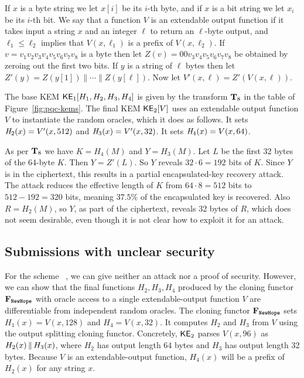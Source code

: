  If $x$ is a byte string we let $x[i]$ be its $i$-th byte, and if $x$ is a bit string we let $x_i$ be its $i$-th bit. We say that a function $V$ is an extendable output function if it takes input a string $x$ and an integer $\ell$ to return an $\ell$-byte output, and $\ell_1 \leq \ell_2$ implies that $V(x,\ell_1)$ is a prefix of $V(x,\ell_2)$. If $v = v_1v_2v_3v_4v_5v_6v_7v_8$ is a byte then let $Z(v) = 00v_3v_4v_5v_6v_7v_8$ be obtained by zeroing out the first two bits. If $y$ is a string of $\ell$ bytes then let $Z'(y) = Z(y[1])\| \cdots \| Z(y[\ell])$. Now let $V'(x,\ell) = Z'(V(x,\ell))$. 

The base KEM ${\mathsf{KE}}_1[H_1,H_2,H_3,H_4]$ is given by the transform $\mathbf{T}_{8}$ in the table of Figure~\ref{fig:pqc-kems}. The final KEM ${\mathsf{KE}}_2[V]$ uses an extendable output function $V$ to instantiate the random oracles, which it does as follows. It sets $\mathit{H}_2(x) = V'(x,512)$ and $\mathit{H}_3(x) = V'(x,32)$. It sets $\mathit{H}_4(x) = V(x,64)$. 

As per $\mathbf{T}_8$ we have $K = H_4(M)$ and $Y = H_3(M)$. Let $L$ be the first 32 bytes of the 64-byte $K$. Then $Y = Z'(L)$. So $Y$ reveals $32\cdot 6 = 192$ bits of $K$. Since $Y$ is in the ciphertext, this results in a partial encapsulated-key recovery attack. The attack reduces the effective length of $K$ from $64\cdot 8 = 512$ bits to $512-192 = 320$ bits, meaning $37.5\%$ of the encapsulated key is recovered. Also $R = H_2(M)$, so $Y$, as part of the ciphertext, reveals 32 bytes of $R$, which does not seem desirable, even though it is not clear how to exploit it for an attack.


\subsection{Submissions with unclear security}

For the scheme ~\cite{nistpqc:NewHope}, we can give neither an attack nor a proof of security. However, we can show that the final functions $H_2, H_3, H_4$ produced by the cloning functor $\construct{F}_{\pqcnameRoundTwo{NewHope}}$ with oracle access to a single extendable-output function $V$ are differentiable from independent random oracles. The cloning functor $\construct{F}_{\pqcnameRoundTwo{NewHope}}$ sets $H_1(x)=V(x,128)$ and $H_4 = V(x,32)$. It computes $H_2$ and $H_3$ from $V$ using the output splitting cloning functor. Concretely, ${\mathsf{KE}}_2$ parses $V(x,96)$ as $H_2(x){\,\|\,} H_3(x)$, where $H_2$ has output length 64 bytes and $H_3$ has output length 32 bytes. Because $V$ is an extendable-output function, $H_4(x)$ will be a prefix of $H_2(x)$ for any string $x$.

